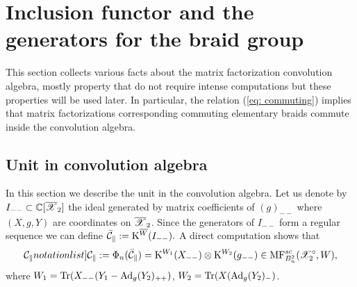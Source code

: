 
\section{Inclusion functor and the generators for the braid group}\label{sec: inc fun gens}



This section collects various facts about the matrix factorization convolution algebra, mostly property that do not require intense computations but these properties will be used later.
In particular, the relation (\ref{eq: commuting}) implies that matrix factorizations corresponding commuting elementary braids commute inside the convolution algebra.





\subsection{Unit in convolution algebra}\label{sec: unit} In this section we describe the unit in the convolution algebra.
 Let us denote by $I_{--}\subset\mathbb{C}[\overline{\mathscr{X}}_2]$ the ideal generated by matrix coefficients of $(g)_{--}$ where $(X,g,Y)$ are coordinates on $\overline{\mathscr{X}}_2$.
Since the generators of $I_{--}$ form a regular sequence
we can define $\bar{\mathcal{C}}_{\parallel}:=\mathrm{K}^{\overline{W}}(I_{--}).$ A direct computation shows that
$$\SymbolPrint{\calC_{\parallel}}:=\Phi_n(\bcalC_{\parallel})=\mathrm{K}^{W_1}(X_{--})\otimes \mathrm{K}^{W_2}(g_{--})\in \MF_{B_n^2}(\calX^{\circ}_2,W),$$
where $W_1=\mathop{{\rm Tr}}\nolimits(X_{--}(Y_1-{\rm Ad}_g(Y_2)_{++})$, $W_2=\mathop{{\rm Tr}}\nolimits(X({\rm Ad}_g(Y_2)_{-})$.

